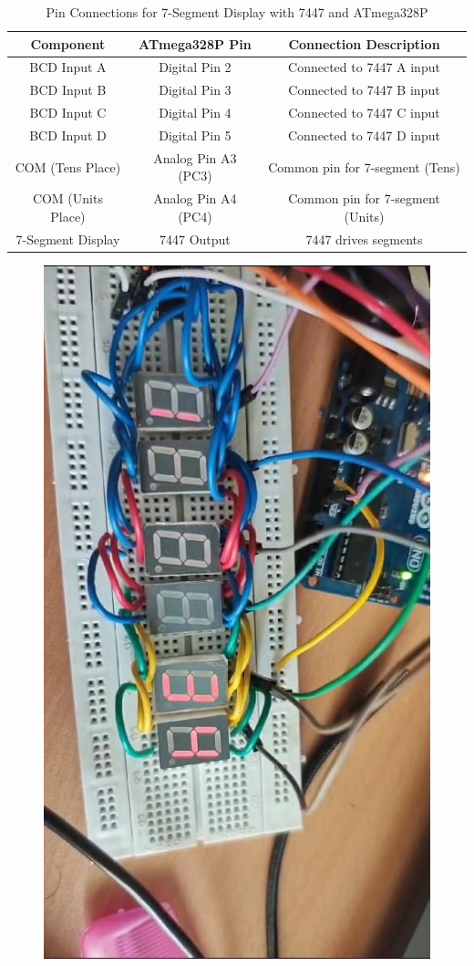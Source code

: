 \begin{table}[h]
    \centering
    \renewcommand{\arraystretch}{1.3}  %
    \begin{tabular}{|c|c|c|}
        \hline
        \textbf{Component} & \textbf{ATmega328P Pin} & \textbf{Connection Description} \\
        \hline
        BCD Input A & Digital Pin 2 & Connected to 7447 A input \\
        BCD Input B & Digital Pin 3 & Connected to 7447 B input \\
        BCD Input C & Digital Pin 4 & Connected to 7447 C input \\
        BCD Input D & Digital Pin 5 & Connected to 7447 D input \\
        \hline
        COM (Tens Place) & Analog Pin A3 (PC3) & Common pin for 7-segment (Tens) \\
        COM (Units Place) & Analog Pin A4 (PC4) & Common pin for 7-segment (Units) \\
        \hline
        7-Segment Display & 7447 Output & 7447 drives segments \\
        \hline
    \end{tabular}
    \vspace{0.5cm}
    \caption{Pin Connections for 7-Segment Display with 7447 and ATmega328P}
\end{table}
\begin{figure}[H]
    \centering
    \includegraphics[width=0.35\linewidth]{WhatsApp Image 2025-03-24 at 18.30.23_1f184068.jpg}
    \caption{}
    \label{fig:enter-label}
\end{figure}